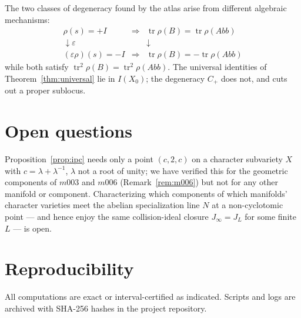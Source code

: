 \documentclass[11pt,a4paper]{article}
\theoremstyle{definition}
\theoremstyle{remark}
\newcommand{\tr}{\operatorname{tr}}
\begin{document}
The two classes of degeneracy found by the atlas arise from different
algebraic mechanisms:
\begin{equation}
\begin{array}{ccc}
\rho(s) = +I & \Longrightarrow & \tr\rho(B) = \tr\rho(Abb) \\[1mm]
\downarrow \varepsilon & & \downarrow \\[1mm]
(\varepsilon\rho)(s) = -I & \Longrightarrow & \tr\rho(B) = -\tr\rho(Abb)
\end{array}
\end{equation}
while both satisfy $\tr^2\rho(B) = \tr^2\rho(Abb)$. The universal
identities of Theorem~\ref{thm:universal} lie in $I(X_0)$; the
degeneracy $C_+$ does not, and cuts out a proper sublocus.

\section{Open questions}

Proposition~\ref{prop:ipc} needs only a point $(c,2,c)$ on a character
subvariety $X$ with $c=\lambda+\lambda^{-1}$, $\lambda$ not a root of
unity; we have verified this for the geometric components of $m003$
and $m006$ (Remark~\ref{rem:m006}) but not for any other manifold or
component. Characterizing which components of which manifolds'
character varieties meet the abelian specialization line $N$ at a
non-cyclotomic point --- and hence enjoy the same collision-ideal
closure $J_\infty=J_L$ for some finite $L$ --- is open.

\section{Reproducibility}
\label{sec:repro}

All computations are exact or interval-certified as indicated.
Scripts and logs are archived with SHA-256 hashes in the project
repository.
\end{document}
